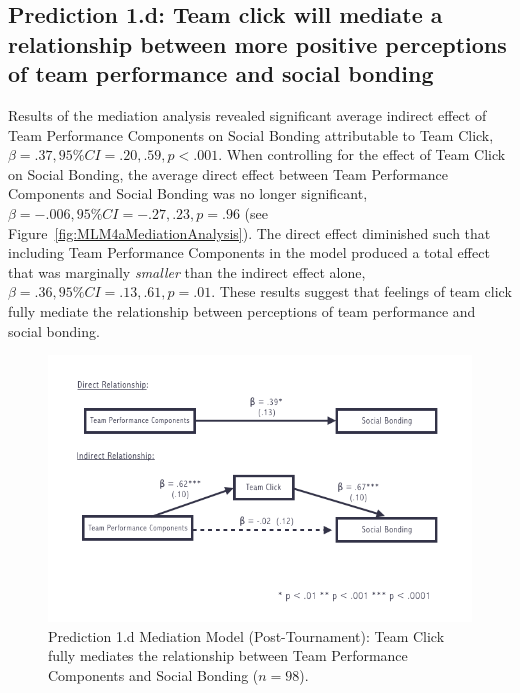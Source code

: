 \begin{CJK}{UTF8}{gbsn}




\subsection{Prediction 1.d: Team click will mediate a relationship between more positive perceptions of team performance and social bonding}


  Results of the mediation analysis revealed significant average indirect effect of Team Performance Components on Social Bonding attributable to Team Click, $\beta = .37, 95\% CI = .20 , .59, p < .001$.  When controlling for the effect of Team Click on Social Bonding, the average direct effect between Team Performance Components and Social Bonding was no longer significant, $\beta = -.006, 95\% CI = -.27 , .23, p = .96 $ (see Figure~\ref{fig:MLM4aMediationAnalysis}). The direct effect diminished such that including Team Performance Components in the model produced a total effect that was marginally \textit{smaller} than the indirect effect alone, $\beta = .36, 95\% CI = .13 , .61, p = .01$. These results suggest that feelings of team click fully mediate the relationship between perceptions of team performance and social bonding.



  \begin{figure}
    \centering
    \includegraphics[width=0.9\linewidth,keepaspectratio] {images/tournamentSurveyMediationFigure}
    \caption{Prediction 1.d Mediation Model (Post-Tournament): Team Click fully mediates the relationship between Team Performance Components and Social Bonding ($n = 98$).}
    \label{fig:tournamentSurveyMediationFigure}
  \end{figure}



\end{CJK}
